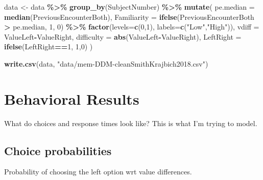 \documentclass[
]{book}
\newenvironment{Shaded}{\begin{snugshade}}{\end{snugshade}}
\newcommand{\AttributeTok}[1]{\textcolor[rgb]{0.13,0.29,0.53}{#1}}
\newcommand{\DecValTok}[1]{\textcolor[rgb]{0.00,0.00,0.81}{#1}}
\newcommand{\FunctionTok}[1]{\textcolor[rgb]{0.13,0.29,0.53}{\textbf{#1}}}
\newcommand{\NormalTok}[1]{#1}
\newcommand{\OtherTok}[1]{\textcolor[rgb]{0.56,0.35,0.01}{#1}}
\newcommand{\SpecialCharTok}[1]{\textcolor[rgb]{0.81,0.36,0.00}{\textbf{#1}}}
\newcommand{\StringTok}[1]{\textcolor[rgb]{0.31,0.60,0.02}{#1}}
\begin{document}
\begin{Shaded}
\begin{Highlighting}[]
\NormalTok{data }\OtherTok{\textless{}{-}}\NormalTok{ data }\SpecialCharTok{\%\textgreater{}\%}
  \FunctionTok{group\_by}\NormalTok{(SubjectNumber) }\SpecialCharTok{\%\textgreater{}\%}
  \FunctionTok{mutate}\NormalTok{(}
    \AttributeTok{pe.median =} \FunctionTok{median}\NormalTok{(PreviousEncounterBoth),}
    \AttributeTok{Familiarity =} \FunctionTok{ifelse}\NormalTok{(PreviousEncounterBoth }\SpecialCharTok{\textgreater{}}\NormalTok{ pe.median, }\DecValTok{1}\NormalTok{, }\DecValTok{0}\NormalTok{) }\SpecialCharTok{\%\textgreater{}\%} \FunctionTok{factor}\NormalTok{(}\AttributeTok{levels=}\FunctionTok{c}\NormalTok{(}\DecValTok{0}\NormalTok{,}\DecValTok{1}\NormalTok{), }\AttributeTok{labels=}\FunctionTok{c}\NormalTok{(}\StringTok{"Low"}\NormalTok{,}\StringTok{"High"}\NormalTok{)),}
    \AttributeTok{vdiff =}\NormalTok{ ValueLeft}\SpecialCharTok{{-}}\NormalTok{ValueRight,}
    \AttributeTok{difficulty =} \FunctionTok{abs}\NormalTok{(ValueLeft}\SpecialCharTok{{-}}\NormalTok{ValueRight),}
    \AttributeTok{LeftRight =} \FunctionTok{ifelse}\NormalTok{(LeftRight}\SpecialCharTok{==}\DecValTok{1}\NormalTok{, }\DecValTok{1}\NormalTok{,}\DecValTok{0}\NormalTok{)}
\NormalTok{  )}

\FunctionTok{write.csv}\NormalTok{(data, }\StringTok{"data/mem{-}DDM{-}cleanSmithKrajbich2018.csv"}\NormalTok{)}
\end{Highlighting}
\end{Shaded}

\hypertarget{behavioral-results}{%
\section{Behavioral Results}\label{behavioral-results}}

What do choices and response times look like? This is what I'm trying to model.

\hypertarget{choice-probabilities}{%
\subsection{Choice probabilities}\label{choice-probabilities}}

Probability of choosing the left option wrt value differences.
\end{document}
